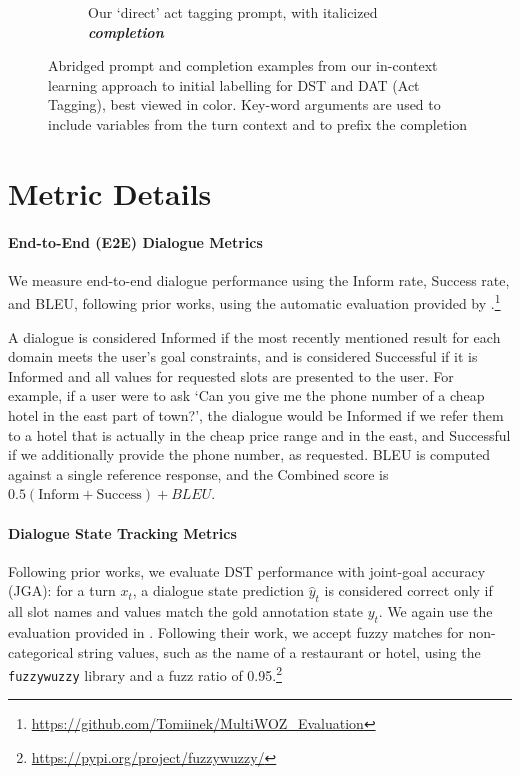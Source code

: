 \documentclass[11pt]{article}
\newcommand{\dstcolor}[1]{\textcolor{dst-color}{#1}}
\begin{document}
\begin{figure}[h]
\begin{subfigure}[b]{0.49\textwidth}
        \caption{Our `direct' act tagging prompt, with italicized \dstcolor{\textit{\textbf{completion}}}}
        \label{fig:direct-act-tag-prompt}
    \end{subfigure}
    \caption{Abridged prompt and completion examples from our in-context learning approach to initial labelling for DST and DAT (Act Tagging), best viewed in color. Key-word arguments are used to include variables from the turn context and to prefix the completion}
    \label{fig:direct-prompt-examples}
\end{figure}


\section{Metric Details}
\label{app:metric_details}
\paragraph{End-to-End (E2E) Dialogue Metrics}
We measure end-to-end dialogue performance using the Inform rate, Success rate, and BLEU, following prior works, using the automatic evaluation provided by \citet{nekvinda-dusek-2021-shades}.\footnote{\href{https://github.com/Tomiinek/MultiWOZ_Evaluation}{https://github.com/Tomiinek/MultiWOZ\_Evaluation}}

A dialogue is considered Informed if the most recently mentioned result for each domain meets the user's goal constraints, and is considered Successful if it is Informed and all values for requested slots are presented to the user. 
For example, if a user were to ask `Can you give me the phone number of a cheap hotel in the east part of town?', the dialogue would be Informed if we refer them to a hotel that is actually in the cheap price range and in the east, and Successful if we additionally provide the phone number, as requested. 
BLEU is computed against a single reference response, and the Combined score is $0.5(\text{Inform} + \text{Success}) + BLEU$.

\paragraph{Dialogue State Tracking Metrics} 
Following prior works, we evaluate DST performance with joint-goal accuracy (JGA): for a turn $x_t$, a dialogue state prediction $\hat{y}_t$ is considered correct only if all slot names and values match the gold annotation state $y_t$. We again use the evaluation provided in \citet{nekvinda-dusek-2021-shades}. Following their work, we accept fuzzy matches for non-categorical string values, such as the name of a restaurant or hotel, using the \texttt{fuzzywuzzy} library and a fuzz ratio of 0.95.\footnote{\href{https://pypi.org/project/fuzzywuzzy/}{https://pypi.org/project/fuzzywuzzy/}} 
\end{document}
